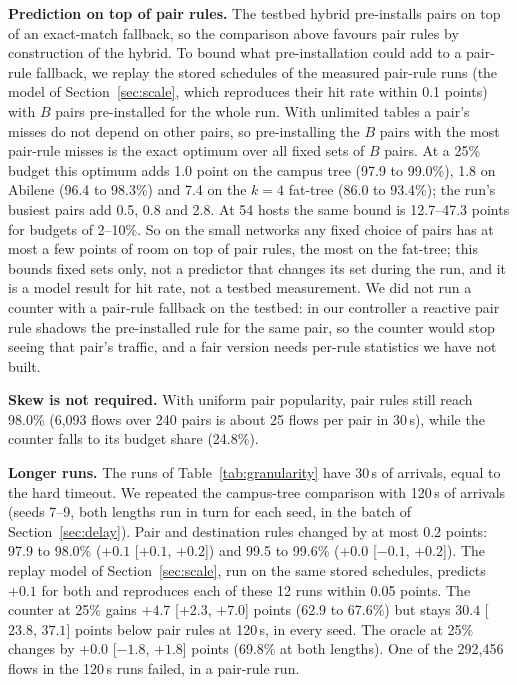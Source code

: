\documentclass[sigconf]{acmart}
\begin{document}
\textbf{Prediction on top of pair rules.} The testbed hybrid pre-installs pairs on top of an exact-match fallback, so the comparison above favours pair rules by construction of the hybrid. To bound what pre-installation could add to a pair-rule fallback, we replay the stored schedules of the measured pair-rule runs (the model of Section~\ref{sec:scale}, which reproduces their hit rate within 0.1 points) with $B$ pairs pre-installed for the whole run. With unlimited tables a pair's misses do not depend on other pairs, so pre-installing the $B$ pairs with the most pair-rule misses is the exact optimum over all fixed sets of $B$ pairs. At a 25\% budget this optimum adds 1.0 point on the campus tree (97.9 to 99.0\%), 1.8 on Abilene (96.4 to 98.3\%) and 7.4 on the $k{=}4$ fat-tree (86.0 to 93.4\%); the run's busiest pairs add 0.5, 0.8 and 2.8. At 54 hosts the same bound is 12.7--47.3 points for budgets of 2--10\%. So on the small networks any fixed choice of pairs has at most a few points of room on top of pair rules, the most on the fat-tree; this bounds fixed sets only, not a predictor that changes its set during the run, and it is a model result for hit rate, not a testbed measurement. We did not run a counter with a pair-rule fallback on the testbed: in our controller a reactive pair rule shadows the pre-installed rule for the same pair, so the counter would stop seeing that pair's traffic, and a fair version needs per-rule statistics we have not built.

\textbf{Skew is not required.} With uniform pair popularity, pair rules still reach 98.0\% (6,093 flows over 240 pairs is about 25 flows per pair in 30\,s), while the counter falls to its budget share (24.8\%).

\textbf{Longer runs.} The runs of Table~\ref{tab:granularity} have 30\,s of arrivals, equal to the hard timeout. We repeated the campus-tree comparison with 120\,s of arrivals (seeds 7--9, both lengths run in turn for each seed, in the batch of Section~\ref{sec:delay}). Pair and destination rules changed by at most 0.2 points: 97.9 to 98.0\% ($+0.1$ [$+0.1$, $+0.2$]) and 99.5 to 99.6\% ($+0.0$ [$-0.1$, $+0.2$]). The replay model of Section~\ref{sec:scale}, run on the same stored schedules, predicts $+0.1$ for both and reproduces each of these 12 runs within 0.05 points. The counter at 25\% gains $+4.7$ [$+2.3$, $+7.0$] points (62.9 to 67.6\%) but stays $30.4$ [$23.8$, $37.1$] points below pair rules at 120\,s, in every seed. The oracle at 25\% changes by $+0.0$ [$-1.8$, $+1.8$] points (69.8\% at both lengths). One of the 292,456 flows in the 120\,s runs failed, in a pair-rule run.
\end{document}
